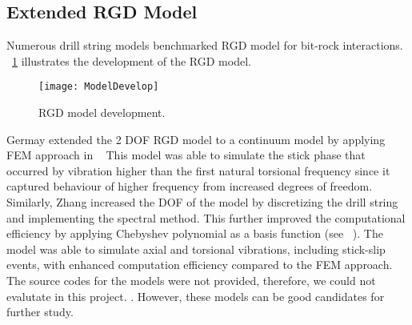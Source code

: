 \subsection{Extended RGD Model}
Numerous drill string models benchmarked RGD model for bit-rock interactions. \figurename~\ref{model_develop_figure} illustrates the development of the RGD model.
\begin{figure}
  \centering
  \texttt{[image: ModelDevelop]}
  \caption[RGD model development]{RGD model development.}\label{model_develop_figure}
\end{figure}
Germay extended the 2 DOF RGD model to a continuum model by applying FEM approach in ~\cite{ref:germay2009a}  This model was able to simulate the stick  phase that occurred by vibration higher than the first natural torsional frequency since it captured behaviour of higher frequency from increased degrees of freedom. Similarly, Zhang increased the DOF of the model by discretizing the drill string and implementing the spectral method. This further improved the computational efficiency by applying Chebyshev polynomial as a basis function (see ~\cite{ref:zhang2020a}). The model was able to simulate axial and torsional vibrations, including stick-slip events, with enhanced computation efficiency compared to the FEM approach. The source codes for the models were not provided, therefore, we could not evalutate in this project. \resolvedcomment{}. However, these models can be good candidates for further study. 